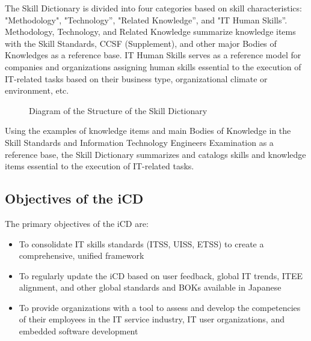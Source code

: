 The Skill Dictionary is divided into four categories based on skill characteristics: "Methodology",
"Technology”, "Related Knowledge”, and "IT Human Skills”.
Methodology, Technology, and Related Knowledge summarize knowledge items with the Skill Standards,
CCSF (Supplement), and other major Bodies of Knowledges as a reference base.
IT Human Skills serves as a reference model for companies and organizations assigning human skills
essential to the execution of IT-related tasks based on their business type, organizational climate or
environment, etc.

\begin{figure}[H]
    \centering
    \caption{  Diagram of the Structure of the Skill Dictionary }
    \label{fig:skill_Dictionary_Diagram}
\end{figure}

\newpage
Using the examples of knowledge items and main Bodies of Knowledge in the Skill Standards and
Information Technology Engineers Examination as a reference base, the Skill Dictionary summarizes and
catalogs skills and knowledge items essential to the execution of IT-related tasks.

\subsection{Objectives of the iCD}
The primary objectives of the iCD are:

\begin{itemize}
    \item To consolidate IT skills standards (ITSS, UISS, ETSS) to create a comprehensive, unified framework
    \item To regularly update the iCD based on user feedback, global IT trends, ITEE alignment, and other global standards and BOKs available in Japanese
    \item To provide organizations with a tool to assess and develop the competencies of their employees in the IT service industry, IT user organizations, and embedded software development
\end{itemize}


